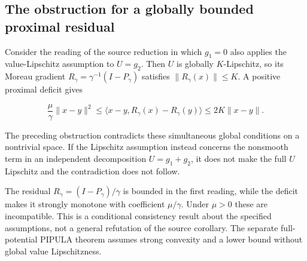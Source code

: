 \documentclass[11pt,a4paper]{report}
\begin{document}
\subsection{\texorpdfstring{The obstruction for a globally bounded proximal residual}{The obstruction for a globally bounded proximal residual}}
\label{report-step-ProximalLangevin-PIPULAConsistency-lean-2}


Consider the reading of the source reduction in which \(g_1=0\) also applies the value-Lipschitz assumption to \(U=g_2\). Then \(U\) is globally \(K\)-Lipschitz, so its Moreau gradient \(R_\gamma=\gamma^{-1}(I-P_\gamma)\) satisfies \(\|R_\gamma(x)\|\le K\). A positive proximal deficit gives

\[
\frac{\mu}{\gamma}\|x-y\|^2
 \le\langle x-y,R_\gamma(x)-R_\gamma(y)\rangle
 \le2K\|x-y\|.
\]

The preceding obstruction contradicts these simultaneous global conditions on a nontrivial space. If the Lipschitz assumption instead concerns the nonsmooth term in an independent decomposition \(U=g_1+g_2\), it does not make the full \(U\) Lipschitz and the contradiction does not follow.



The residual \(R_\gamma=(I-P_\gamma)/\gamma\) is bounded in the first reading, while the deficit makes it strongly monotone with coefficient \(\mu/\gamma\). Under \(\mu>0\) these are incompatible. This is a conditional consistency result about the specified assumptions, not a general refutation of the source corollary. The separate full-potential PIPULA theorem assumes strong convexity and a lower bound without global value Lipschitzness.
\end{document}

